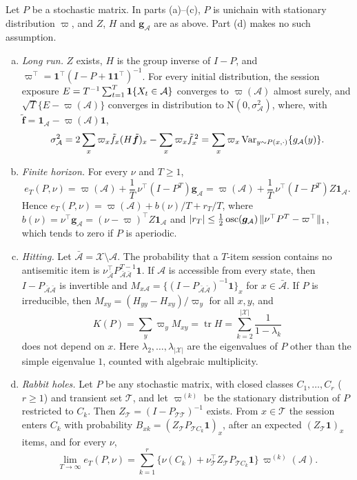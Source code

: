 \begin{proposition}\label{prop:markov}
Let $P$ be a stochastic matrix. In parts (a)--(c), $P$ is unichain with stationary distribution $\varpi$, and $Z$, $H$ and $\bm g_{\mathcal A}$ are as above. Part (d) makes no such assumption.
\begin{enumerate}[(a)]
  \item \emph{Long run.} $Z$ exists, $H$ is the group inverse of $I-P$, and $\varpi^{\top}=\bm1^{\top}(I-P+\bm1\bm1^{\top})^{-1}$. For every initial distribution, the session exposure $E=T^{-1}\sum_{t=1}^{T}\mathbf{1}\!\left\{X_t\in\mathcal A\right\}$ converges to $\varpi(\mathcal A)$ almost surely, and $\sqrt T\{E-\varpi(\mathcal A)\}$ converges in distribution to $\mathrm N(0,\sigma^2_{\mathcal A})$, where, with $\tilde{\bm f}=\bm1_{\mathcal A}-\varpi(\mathcal A)\bm1$,
  \[
    \sigma^2_{\mathcal A}=2\sum_x\varpi_x\tilde f_x(H\tilde{\bm f})_x-\sum_x\varpi_x\tilde f_x^{\,2}
    =\sum_x\varpi_x\operatorname{Var}_{y\sim P(x,\cdot)}\{g_{\mathcal A}(y)\}.
  \]
  \item \emph{Finite horizon.} For every $\nu$ and $T\ge1$,
  \[
    e_T(P,\nu)=\varpi(\mathcal A)+\frac1T\,\nu^{\top}(I-P^{T})\bm g_{\mathcal A}
    =\varpi(\mathcal A)+\frac1T\,\nu^{\top}(I-P^{T})Z\bm1_{\mathcal A}.
  \]
  Hence $e_T(P,\nu)=\varpi(\mathcal A)+b(\nu)/T+r_T/T$, where $b(\nu)=\nu^{\top}\bm g_{\mathcal A}=(\nu-\varpi)^{\top}Z\bm1_{\mathcal A}$ and $|r_T|\le\frac12\operatorname{osc}(\bm g_{\mathcal A})\,\|\nu^{\top}P^{T}-\varpi^{\top}\|_1$, which tends to zero if $P$ is aperiodic.
  \item \emph{Hitting.} Let $\bar{\mathcal A}=\mathcal X\setminus\mathcal A$. The probability that a $T$-item session contains no antisemitic item is $\nu_{\bar{\mathcal A}}^{\top}P_{\bar{\mathcal A}\bar{\mathcal A}}^{T-1}\bm1$. If $\mathcal A$ is accessible from every state, then $I-P_{\bar{\mathcal A}\bar{\mathcal A}}$ is invertible and $M_{x\mathcal A}=\{(I-P_{\bar{\mathcal A}\bar{\mathcal A}})^{-1}\bm1\}_x$ for $x\in\bar{\mathcal A}$. If $P$ is irreducible, then $M_{xy}=(H_{yy}-H_{xy})/\varpi_y$ for all $x,y$, and
  \[
    K(P)=\sum_y\varpi_yM_{xy}=\operatorname{tr}H=\sum_{k=2}^{|\mathcal X|}\frac{1}{1-\lambda_k}
  \]
  does not depend on $x$. Here $\lambda_2,\dots,\lambda_{|\mathcal X|}$ are the eigenvalues of $P$ other than the simple eigenvalue $1$, counted with algebraic multiplicity.
  \item \emph{Rabbit holes.} Let $P$ be any stochastic matrix, with closed classes $C_1,\dots,C_r$ ($r\ge1$) and transient set $\mathcal T$, and let $\varpi^{(k)}$ be the stationary distribution of $P$ restricted to $C_k$. Then $Z_{\mathcal T}=(I-P_{\mathcal T\mathcal T})^{-1}$ exists. From $x\in\mathcal T$ the session enters $C_k$ with probability $B_{xk}=(Z_{\mathcal T}P_{\mathcal TC_k}\bm1)_x$, after an expected $(Z_{\mathcal T}\bm1)_x$ items, and for every $\nu$,
  \[
    \lim_{T\to\infty}e_T(P,\nu)=\sum_{k=1}^{r}\bigl\{\nu(C_k)+\nu_{\mathcal T}^{\top}Z_{\mathcal T}P_{\mathcal TC_k}\bm1\bigr\}\,\varpi^{(k)}(\mathcal A).
  \]
\end{enumerate}
\end{proposition}


